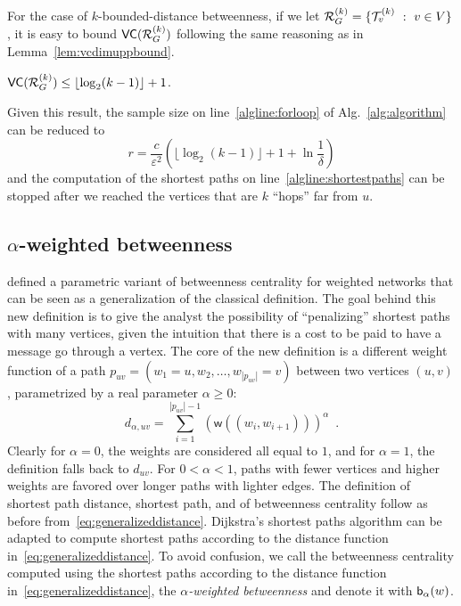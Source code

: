 For the case of $k$-bounded-distance betweenness, if we let
$\mathcal{R}_G^{(k)}=\{\mathcal{T}_v^{(k)}~:~ v\in V\}$, it is easy to bound
$\mathsf{VC}(\mathcal{R}_G^{(k)})$ following the same reasoning as in
Lemma~\ref{lem:vcdimuppbound}.
\begin{lemma}\label{lem:vcdimuppboundk}
$\mathsf{VC}(\mathcal{R}_G^{(k)})\le\lfloor\log_2(k-1)\rfloor+1$.
\end{lemma}

Given this result, the sample size on line~\ref{algline:forloop}
of Alg.~\ref{alg:algorithm} can be reduced to 
\[ 
  r= \frac{c}{\varepsilon^2}\left(\lfloor\log_2(k-1)\rfloor + 1 +\ln\frac{1}{\delta}\right)
\]
and the computation of the shortest paths on line~\ref{algline:shortestpaths}
can be stopped after we reached the vertices that are $k$ ``hops'' far from $u$.

\subsection{$\alpha$-weighted betweenness}
\citet{OpsahlAS10} defined a parametric variant of betweenness centrality for
weighted networks that can be seen as a generalization of the classical 
definition. The goal behind this new definition is to give the analyst the
possibility of ``penalizing'' shortest paths with many vertices, given the
intuition that there is a cost to be paid to have a message go through a vertex.
The core of the new definition is a different weight function of a path
$p_{uv}=(w_1=u,w_2,\dotsc,w_{|p_{uv}|}=v)$ between two vertices $(u,v)$,
parametrized by a real parameter $\alpha\ge 0$:
\begin{equation}\label{eq:generalizeddistance}
d_{\alpha,uv}=\sum_{i=1}^{|p_{uv}|-1}(\mathsf{w}((w_i,w_{i+1})))^\alpha\enspace. 
\end{equation}
Clearly for $\alpha=0$, the weights are considered all equal to $1$, and for
$\alpha=1$, the definition falls back to $d_{uv}$. For $0<\alpha<1$, paths with
fewer vertices and higher weights are favored over longer paths with lighter
edges\citep{OpsahlAS10}. The definition of shortest path distance, shortest
path, and of betweenness centrality follow as before
from~\eqref{eq:generalizeddistance}. Dijkstra's shortest paths algorithm can be
adapted to compute shortest paths according to the distance function
in~\eqref{eq:generalizeddistance}. To avoid confusion, we call the betweenness
centrality computed using the shortest paths according to the distance function
in~\eqref{eq:generalizeddistance}, the \emph{$\alpha$-weighted betweenness} and
denote it with $\mathsf{b}_\alpha(w)$. 


